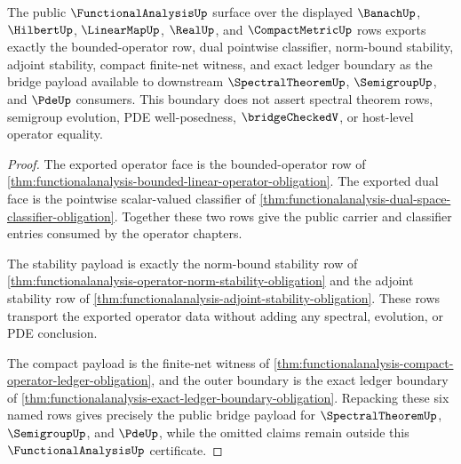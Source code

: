 \begin{theorem}
\label{thm:functionalanalysis-public-bridge-boundary}
The public $\FunctionalAnalysisUp$ surface over the displayed $\BanachUp$,
$\HilbertUp$, $\LinearMapUp$, $\RealUp$, and $\CompactMetricUp$ rows exports
exactly the bounded-operator row, dual pointwise classifier, norm-bound
stability, adjoint stability, compact finite-net witness, and exact ledger
boundary as the bridge payload available to downstream $\SpectralTheoremUp$,
$\SemigroupUp$, and $\PdeUp$ consumers. This boundary does not assert spectral
theorem rows, semigroup evolution, PDE well-posedness, $\bridgeCheckedV$, or
host-level operator equality.
\end{theorem}
\begin{proof}
The exported operator face is the bounded-operator row of
\autoref{thm:functionalanalysis-bounded-linear-operator-obligation}. The
exported dual face is the pointwise scalar-valued classifier of
\autoref{thm:functionalanalysis-dual-space-classifier-obligation}. Together
these two rows give the public carrier and classifier entries consumed by the
operator chapters.

The stability payload is exactly the norm-bound stability row of
\autoref{thm:functionalanalysis-operator-norm-stability-obligation} and the
adjoint stability row of
\autoref{thm:functionalanalysis-adjoint-stability-obligation}. These rows
transport the exported operator data without adding any spectral, evolution, or
PDE conclusion.

The compact payload is the finite-net witness of
\autoref{thm:functionalanalysis-compact-operator-ledger-obligation}, and the
outer boundary is the exact ledger boundary of
\autoref{thm:functionalanalysis-exact-ledger-boundary-obligation}. Repacking
these six named rows gives precisely the public bridge payload for
$\SpectralTheoremUp$, $\SemigroupUp$, and $\PdeUp$, while the omitted claims
remain outside this $\FunctionalAnalysisUp$ certificate.
\end{proof}

